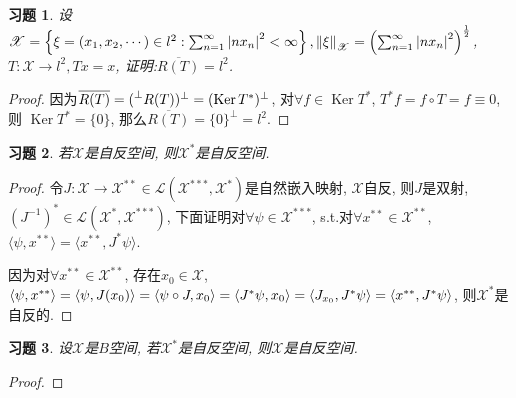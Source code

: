 \documentclass[a4paper,oneside,12pt]{ctexart}
\theoremstyle{plain}
\newtheorem{exercise}{习题}
\theoremstyle{nonumberplain}
\theoremstyle{nonumberplain}
\newtheorem{proof}{证明}
\newcommand{\sX}{\mathscr{X}}
\newcommand{\sL}{\mathscr{L}}
\newcommand{\leftperp}{\prescript{\perp}{}}
\DeclareMathOperator{\Ker}{Ker}
\begin{document}
    \begin{exercise}
        \label{ex:6 on note}
        设$\sX=\left\{\xi=(x_1,x_2,\cdots)\in l^2:\sum_{n=1}^\infty\abs{nx_n}^2<\infty\right\},\norm{\xi}_{\sX}=\left(\sum_{n=1}^\infty \abs{nx_n}^2\right)^{\frac{1}{2}}$, 
        $T:\sX\rightarrow l^2, Tx=x$, 证明:$\overline{R(T)}=l^2$.
    \end{exercise}

    \begin{proof}
        因为$\overline{R(T)}=(\leftperp R(T))^\perp=(\Ker T^\ast)^\perp$, 对$\forall f\in\Ker T^\ast$, $T^\ast f=f\circ T=f\equiv 0$, 则
        $\Ker T^\ast=\{0\}$, 那么$\overline{R(T)}=\{0\}^\perp=l^2$.
    \end{proof}

    \begin{exercise}
        \label{ex:7 on note}
        若$\sX$是自反空间, 则$\sX^\ast$是自反空间.
    \end{exercise}

    \begin{proof}
        令$J:\sX\longrightarrow \sX^{\ast\ast}\in\sL(\sX^{\ast\ast\ast},\sX^\ast)$是自然嵌入映射, $\sX$自反, 则$J$是双射, $(J^{-1})^\ast\in\sL(\sX^\ast,\sX^{\ast\ast\ast})$, 
        下面证明对$\forall \psi\in\sX^{\ast\ast\ast}$, s.t.对$\forall x^{\ast\ast}\in\sX^{\ast\ast}$, $\langle\psi,x^{\ast\ast}\rangle=\langle x^{\ast\ast},J^\ast\psi\rangle$.

        因为对$\forall x^{\ast\ast}\in\sX^{\ast\ast}$, 存在$x_0\in\sX$, $\expval{\psi,x^{\ast\ast}}=\expval{\psi,J(x_0)}=\expval{\psi\circ J,x_0}=
        \expval{J^\ast\psi,x_0}=\expval{J_{x_0},J^\ast\psi}=\expval{x^{\ast\ast},J^\ast\psi}$, 则$\sX^\ast$是自反的.
    \end{proof}

    \begin{exercise}
        \label{ex:8 on note}
        设$\sX$是$B$空间, 若$\sX^\ast$是自反空间, 则$\sX$是自反空间.
    \end{exercise}

    \begin{proof}
        
    \end{proof}
\end{document}
